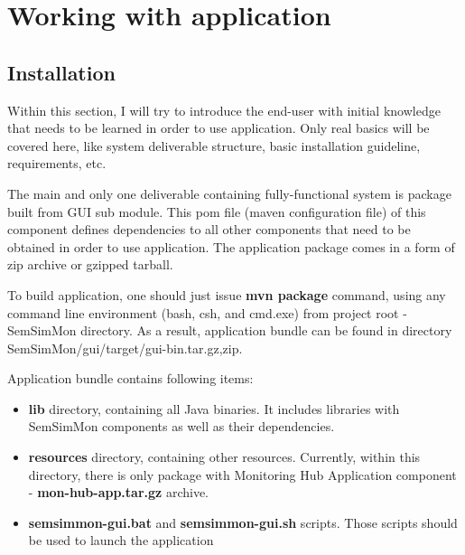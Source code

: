 %
\section{Working with application}

\subsection{Installation}
\label{sec:ch7_working_with}

Within this section, I will try to introduce the end-user with initial knowledge that needs to be learned in order to use application. Only real basics will be covered here, like system deliverable structure, basic installation guideline, requirements, etc.

The main and only one deliverable containing fully-functional system is package built from GUI sub module. This pom file (maven configuration file) of this component defines dependencies to all other components that need to be obtained in order to use application. The application package comes in a form of zip archive or gzipped tarball. 

To build application, one should just issue {\bf mvn package} command, using any command line environment (bash, csh, and cmd.exe) from project root - SemSimMon directory. As a result, application bundle can be found in directory SemSimMon/gui/target/gui-bin.{tar.gz,zip}.

Application bundle contains following items:

\begin{itemize}

\item {\bf lib} directory, containing all Java binaries. It includes libraries with SemSimMon components as well as their dependencies.

\item {\bf resources} directory, containing other resources. Currently, within this directory, there is only package with Monitoring Hub Application component - {\bf mon-hub-app.tar.gz} archive.

\item {\bf semsimmon-gui.bat} and {\bf semsimmon-gui.sh} scripts. Those scripts should be used to launch the application 

\end{itemize} 

